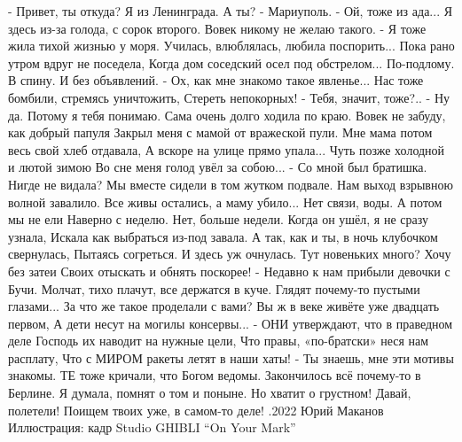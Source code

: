 \raggedcolumns
\begin{multicols}{2} %
\setlength{\parindent}{0pt}

\obeycr
- Привет, ты откуда? Я из Ленинграда. А ты?
- Мариуполь. 
- Ой, тоже из ада...
\smallskip
Я здесь из-за голода, с сорок второго.
Вовек никому не желаю такого.
- Я тоже жила тихой жизнью у моря.
\smallskip
Училась, влюблялась, любила поспорить...
Пока рано утром вдруг не поседела,
Когда дом соседский осел под обстрелом...
По-подлому. В спину. И без объявлений.
\smallskip
- Ох, как мне знакомо такое явленье...
Нас тоже бомбили, стремясь уничтожить,
Стереть непокорных!
\smallskip
- Тебя, значит, тоже?..
- Ну да. Потому я тебя понимаю.
\smallskip
Сама очень долго ходила по краю.
Вовек не забуду, как добрый папуля
Закрыл меня с мамой от вражеской пули.
\smallskip
Мне мама потом весь свой хлеб отдавала,
А вскоре на улице прямо упала...
Чуть позже холодной и лютой зимою
Во сне меня голод увёл за собою...
\smallskip
- Со мной был братишка. Нигде не видала?
Мы вместе сидели в том жутком подвале.
Нам выход взрывною волной завалило.
\smallskip
Все живы остались, а маму убило...
Нет связи, воды. А потом мы не ели
Наверно с неделю. Нет, больше недели.
\smallskip
Когда он ушёл, я не сразу узнала,
Искала как выбраться из-под завала.
А так, как и ты, в ночь клубочком свернулась,
Пытаясь согреться. И здесь уж очнулась.
\smallskip
Тут новеньких много? Хочу без затеи
Своих отыскать и обнять поскорее!
- Недавно к нам прибыли девочки с Бучи.
Молчат, тихо плачут, все держатся в куче.
Глядят почему-то пустыми глазами...
\smallskip
За что же такое проделали с вами?
Вы ж в веке живёте уже двадцать первом,
А дети несут на могилы консервы...
\smallskip
- ОНИ утверждают, что в праведном деле
Господь их наводит на нужные цели,
Что правы, «по-братски» неся нам расплату,
Что с МИРОМ ракеты летят в наши хаты!
\smallskip
- Ты знаешь, мне эти мотивы знакомы.
ТЕ тоже кричали, что Богом ведомы.
Закончилось всё почему-то в Берлине.
Я думала, помнят о том и поныне.
\smallskip
Но хватит о грустном! Давай, полетели!
Поищем твоих уже, в самом-то деле!
.2022  Юрий Маканов
\smallskip
Иллюстрация: кадр Studio GHIBLI \enquote{On Your Mark}
\restorecr
\end{multicols} %
